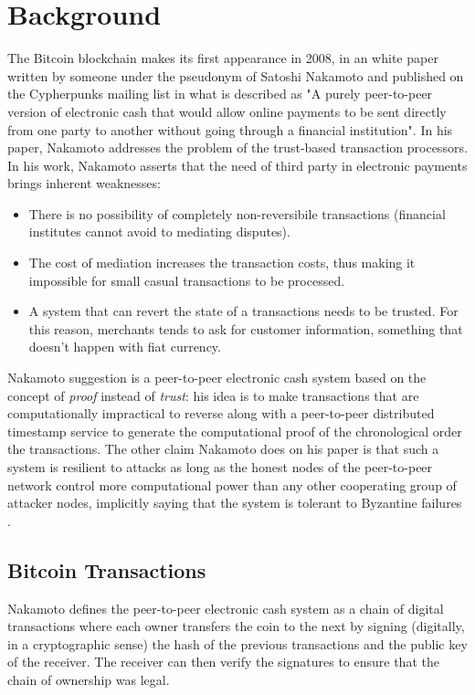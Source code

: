 
	\chapter{Background}
		The Bitcoin blockchain makes its first appearance in 2008, in an white paper written by someone under the pseudonym of Satoshi Nakamoto \cite{Nakamoto2008} and published on the Cypherpunks mailing list in what is described as "A purely peer-to-peer version of electronic cash that would allow online payments to be sent directly from one party to another without going through a financial institution". In his paper, Nakamoto addresses the problem of the trust-based transaction processors. In his work, Nakamoto asserts that the need of third party in electronic payments brings inherent weaknesses:
		\begin{itemize}
			\item There is no possibility of completely non-reversibile transactions (financial institutes cannot avoid to mediating disputes).
			\item The cost of mediation increases the transaction costs, thus making it impossible for small casual transactions to be processed.
			\item A system that can revert the state of a transactions needs to be trusted. For this reason, merchants tends to ask for customer information, something that doesn't happen with fiat currency.
		\end{itemize}
		Nakamoto suggestion is a peer-to-peer electronic cash system based on the concept of \textit{proof} instead of \textit{trust}: his idea is to make transactions that are computationally impractical to reverse along with a peer-to-peer distributed timestamp service to generate the computational proof of the chronological order the transactions. The other claim Nakamoto does on his paper is that such a system is resilient to attacks as long as the honest nodes of the peer-to-peer network control more computational power than any other cooperating group of attacker nodes, implicitly saying that the system is tolerant to Byzantine failures \cite{Lamport1982}.
		
	\section{Bitcoin Transactions}
		Nakamoto defines the peer-to-peer electronic cash system as a chain of digital transactions where each owner transfers the coin to the next by signing (digitally, in a cryptographic sense) the hash of the previous transactions and the public key of the receiver. The receiver can then verify the signatures to ensure that the chain of ownership was legal. 
		
